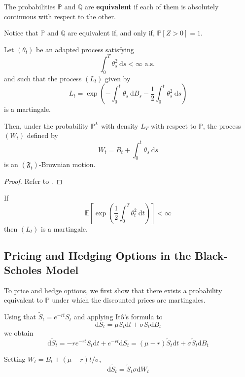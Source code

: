 \begin{definition}
    The probabilities $\mathbb{P}$ and $\mathbb{Q}$ are \textbf{equivalent} if each of them is absolutely continuous with respect to the other. 
\end{definition}

Notice that $\mathbb{P}$ and $\mathbb{Q}$ are equivalent if, and only if, $\mathbb{P}[Z > 0] = 1$.

\begin{theorem}[Girsanov]
    Let $(\theta_t)$ be an adapted process satisfying 
    \[
        \int_0^T \theta_s^2 ~\mathrm{d}s < \infty \text{ a.s. }
    \]
    and such that the process $(L_t)$ given by 
    \[
        L_t = \exp \left(-\int_0^t \theta_s ~\mathrm{d}B_s - \frac{1}{2} \int_0^t \theta_s^2 ~\mathrm{d}s \right)
    \] 
    is a martingale. 

    Then, under the probability $\mathbb{P}^L$ with density $L_T$ with respect to $\mathbb{P}$, the process $(W_t)$ defined by
    \[
        W_t = B_t + \int_0^t \theta_s ~\mathrm{d}s
    \]
    is an $(\mathfrak{F}_t)$-Brownian motion. 
\end{theorem}

\begin{proof}
    Refer to \cite[Theorem 5.2.3]{shreve2004stochastic}.
\end{proof}

\begin{remark}
    If 
    \[
        \mathbb{E}\left[ \exp \left( \frac{1}{2} \int_0^T \theta_t^2 ~\mathrm{d}t \right)\right] < \infty
    \]
    then $(L_t)$ is a martingale.
\end{remark}

\subsection{Pricing and Hedging Options in the Black-Scholes Model}

To price and hedge options, we first show that there exists a probability equivalent to $\mathbb{P}$ under which the discounted prices are martingales. 

Using that $\tilde{S}_t = e^{-rt} S_t$ and applying Itô's formula to 
\[
    \mathrm{d} S_t = \mu S_t \mathrm{d}t + \sigma S_t \mathrm{d}B_t
\]
we obtain 
\[
    \mathrm{d} \tilde{S}_t = -re^{-rt} S_t \mathrm{d} t + e^{-rt} \mathrm{d}S_t = (\mu - r)\tilde{S}_t \mathrm{d}t + \sigma \tilde{S}_t \mathrm{d}B_t
\]

Setting $W_t = B_t + (\mu - r)t/\sigma$, 
\begin{equation}\label{eq:202305051135}
    \mathrm{d} \tilde{S}_t = \tilde{S}_t \sigma \mathrm{d}W_t
\end{equation}

